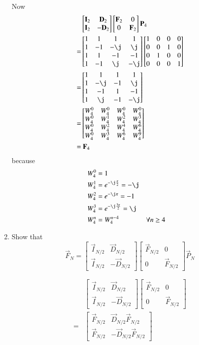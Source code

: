 \documentclass[journal,12pt,twocolumn]{IEEEtran}
\newcommand{\mymat}[1]{\ensuremath{\begin{bmatrix}#1\end{bmatrix}}}
\renewcommand\thesection{\arabic{section}}
\begin{document}
\begin{enumerate}[label=\thesection.\arabic*]
Now
\begin{align}
	&\mymat{\vec{I}_2 & \vec{D}_2 \\ \vec{I}_2 & -\vec{D}_2} \mymat{\vec{F}_2 & 0 \\ 0 & \vec{F}_2} \vec{P}_4 \\
	= &\mymat{1 & 1 & 1 & 1 \\ 1 & -1 & -\j & \j \\ 1 & 1 & -1 & -1 \\ 1 & -1 & \j & -\j} \mymat{1 & 0 & 0 & 0 \\ 0 & 0 & 1 & 0 \\ 0 & 1 & 0 & 0 \\ 0 & 0 & 0 & 1} \\
	= &\mymat{1 & 1 & 1 & 1 \\ 1 & -\j & -1 & \j \\ 1 & -1 & 1 & -1 \\ 1 & \j & -1 & -\j} \\
	= &\mymat{W_4^0 & W_4^0 & W_4^0 & W_4^0 \\ W_4^0 & W_4^1 & W_4^2 & W_4^3 \\ W_4^0 & W_4^2 & W_4^4 & W_4^6 \\ W_4^0 & W_4^3 & W_4^6 & W_4^9} \\
	= &~\vec{F}_4
\end{align}
because
\begin{align}
	W_4^0 &= 1 \\
	W_4^1 &= e^{-\j\frac{\pi}{2}} = -\j \\
	W_4^2 &= e^{-\j\pi} = -1 \\
	W_4^3 &= e^{-\j\frac{3\pi}{2}} = \j \\
	W_4^n &= W_4^{n - 4} &&\forall n \ge 4
\end{align}	 	

\item Show that 
\begin{equation}
\vec{F}_{N}=
\begin{bmatrix}
\vec{I}_{N/2} & \vec{D}_{N/2} \\
\vec{I}_{N/2} & -\vec{D}_{N/2}
\end{bmatrix}
\begin{bmatrix}
\vec{F}_{N/2} & 0 \\
0 & \vec{F}_{N/2}
\end{bmatrix}
\vec{P}_{N}
\end{equation}

\solution
\begin{align}
	&\mymat{\vec{I}_{N/2} & \vec{D}_{N/2} \\ \vec{I}_{N/2} & -\vec{D}_{N/2}} \mymat{\vec{F}_{N/2} & 0 \\ 0 & \vec{F}_{N/2}}  \\
	= &\mymat{\vec{F}_{N/2} & \vec{D}_{N/2}\vec{F}_{N/2} \\ \vec{F}_{N/2} & -\vec{D}_{N/2}\vec{F}_{N/2}}
\end{align}


\end{enumerate}
\end{document}
